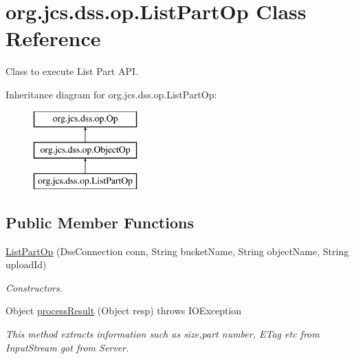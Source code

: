 \hypertarget{classorg_1_1jcs_1_1dss_1_1op_1_1ListPartOp}{}\section{org.\+jcs.\+dss.\+op.\+List\+Part\+Op Class Reference}
\label{classorg_1_1jcs_1_1dss_1_1op_1_1ListPartOp}


Class to execute List Part A\+PI.  


Inheritance diagram for org.\+jcs.\+dss.\+op.\+List\+Part\+Op\+:\begin{figure}[H]
\begin{center}
\leavevmode
\includegraphics[height=3.000000cm]{classorg_1_1jcs_1_1dss_1_1op_1_1ListPartOp}
\end{center}
\end{figure}
\subsection*{Public Member Functions}
\begin{DoxyCompactItemize}
\item 
\hyperlink{classorg_1_1jcs_1_1dss_1_1op_1_1ListPartOp_a3783f9f4cfd10805e57756f359a734fe}{List\+Part\+Op} (Dss\+Connection conn, String bucket\+Name, String object\+Name, String upload\+Id)\hypertarget{classorg_1_1jcs_1_1dss_1_1op_1_1ListPartOp_a3783f9f4cfd10805e57756f359a734fe}{}\label{classorg_1_1jcs_1_1dss_1_1op_1_1ListPartOp_a3783f9f4cfd10805e57756f359a734fe}

\begin{DoxyCompactList}\small\item\em Constructors. \end{DoxyCompactList}\item 
Object \hyperlink{classorg_1_1jcs_1_1dss_1_1op_1_1ListPartOp_a2dc96679605e098dc2f7f37076cef252}{process\+Result} (Object resp)  throws I\+O\+Exception
\begin{DoxyCompactList}\small\item\em This method extracts information such as size,part number, E\+Tag etc from Input\+Stream got from Server. \end{DoxyCompactList}\end{DoxyCompactItemize}
